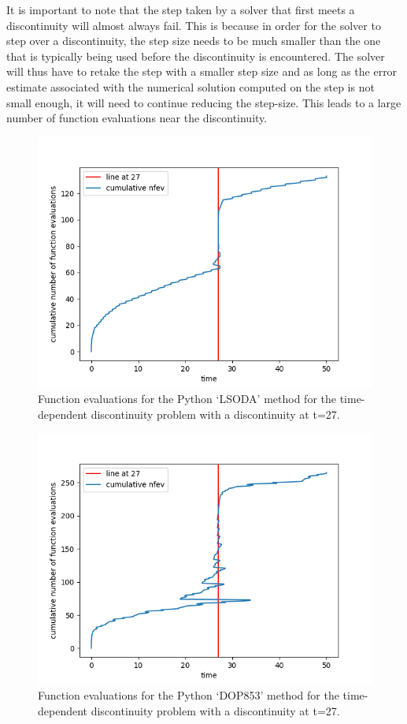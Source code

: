 It is important to note that the step taken by a solver that first meets a discontinuity will almost always fail. This is because in order for the solver to step over a discontinuity, the step size needs to be much smaller than the one that is typically being used before the discontinuity is encountered. The solver will thus have to retake the step with a smaller step size and as long as the error estimate associated with the numerical solution computed on the step is not small enough, it will need to continue reducing the step-size. This leads to a large number of function evaluations near the discontinuity. 

\begin{figure}[h]
\centering
\includegraphics[width=0.7\linewidth]{./figures/lsoda_vs_discontinuity}
\caption{Function evaluations for the Python `LSODA' method for the time-dependent discontinuity problem with a discontinuity at t=27.}
\label{fig:lsoda_vs_discontinuity}
\end{figure}

\begin{figure}[h]
\centering
\includegraphics[width=0.7\linewidth]{./figures/dop853_vs_discontinuity}
\caption{Function evaluations for the Python `DOP853' method for the time-dependent discontinuity problem with a discontinuity at t=27.}
\label{fig:dop853_vs_discontinuity}
\end{figure}

